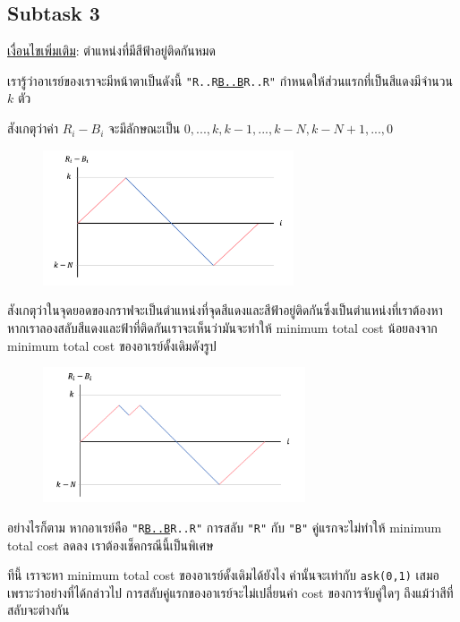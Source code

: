 \documentclass[12pt]{article}
\newcommand{\code}[1]{\texttt{\scriptsize{#1}}}
\begin{document}

\newpage
\subsection{Subtask 3}

\underline{เงื่อนไขเพิ่มเติม}: ตำแหน่งที่มีสีฟ้าอยู่ติดกันหมด

เรารู้ว่าอาเรย์ของเราจะมีหน้าตาเป็นดังนี้ \code{"R..R\underline{B..B}R..R"} กำหนดให้ส่วนแรกที่เป็นสีแดงมีจำนวน $k$ ตัว

สังเกตุว่าค่า $R_i - B_i$ จะมีลักษณะเป็น $0, ..., k, k-1, ..., k-N, k-N+1, ..., 0$ 

\begin{figure}[h]
  \centering
  \includegraphics[height=4cm]{./images/colorblind4.png}
\end{figure}

สังเกตุว่าในจุดยอดของกราฟจะเป็นตำแหน่งที่จุดสีแดงและสีฟ้าอยู่ติดกันซึ่งเป็นตำแหน่งที่เราต้องหา หากเราลองสลับสีแดงและฟ้าที่ติดกันเราจะเห็นว่ามันจะทำให้ minimum total cost น้อยลงจาก minimum total cost ของอาเรย์ดั้งเดิมดังรูป

\begin{figure}[h]
  \centering
  \includegraphics[height=4cm]{./images/colorblind5.png}
\end{figure}

อย่างไรก็ตาม หากอาเรย์คือ \code{"R\underline{B..B}R..R"} การสลับ \code{"R"} กับ \code{"B"} คู่แรกจะไม่ทำให้ minimum total cost ลดลง เราต้องเช็คกรณีนี้เป็นพิเศษ

ทีนี้ เราจะหา minimum total cost ของอาเรย์ดั้งเดิมได้ยังไง ค่านั้นจะเท่ากับ \code{ask(0,1)} เสมอ เพราะว่าอย่างที่ได้กล่าวไป การสลับคู่แรกของอาเรย์จะไม่เปลี่ยนค่า cost ของการจับคู่ใดๆ ถึงแม้ว่าสีที่สลับจะต่างกัน
\end{document}
